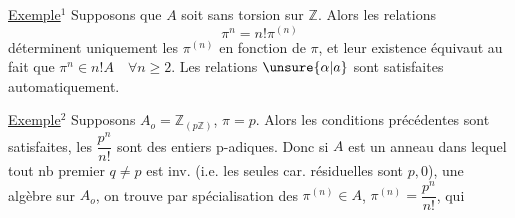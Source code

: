 \uline{Exemple$^1$} Supposons que $A$ soit sans torsion sur $\mathbb Z$. Alors les  relations
\[
\pi^n=n!\pi^{(n)}
\]
déterminent uniquement les $\pi^{(n)}$ en fonction de $\pi$, et leur existence équivaut au fait que $\pi^n\in n!A\quad\forall n\geq2$. Les relations $\unsure{\alpha|a}$ sont satisfaites automatiquement.

\uline{Exemple$^2$} Supposons $A_o=\mathbb Z_{(p\mathbb Z)}$,  $\pi=p$. Alors les conditions précédentes sont satisfaites,
les $\dfrac{p^n}{n!}$ sont des entiers p-adiques. Donc si $A$ est un anneau dans lequel tout nb premier $q\ne p$ est inv. (i.e. les seules car. résiduelles sont $p,0$),  une algèbre sur $A_o$, on trouve par spécialisation des $\pi^{(n)}\in A$, $\pi^{(n)}=\dfrac{p^n}{n!}$, qui
